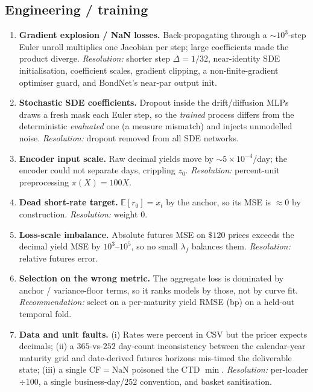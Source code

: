 \documentclass[11pt]{article}
\newcommand{\E}{\mathbb{E}}
\newcommand{\cf}{\mathrm{CF}}
\begin{document}
\subsection{Engineering / training}
\begin{enumerate}[leftmargin=2em,label=\textbf{E\arabic*.}]
\item\label{prob:nan} \textbf{Gradient explosion / NaN losses.} Back-propagating
through a $\sim\!10^3$-step Euler unroll multiplies one Jacobian per step;
large coefficients made the product diverge.
\emph{Resolution:} shorter step $\Delta=1/32$, near-identity SDE
initialisation, coefficient scales, gradient clipping, a non-finite-gradient
optimiser guard, and BondNet's near-par output init.
\item\label{prob:dropout} \textbf{Stochastic SDE coefficients.} Dropout inside
the drift/diffusion MLPs draws a fresh mask each Euler step, so the
\emph{trained} process differs from the deterministic \emph{evaluated} one (a
measure mismatch) and injects unmodelled noise. \emph{Resolution:} dropout
removed from all SDE networks.
\item\label{prob:enc} \textbf{Encoder input scale.} Raw decimal yields move by
$\sim 5\times10^{-4}$/day; the encoder could not separate days, crippling
$z_0$. \emph{Resolution:} percent-unit preprocessing $\pi(X)=100X$.
\item\label{prob:deadsr} \textbf{Dead short-rate target.} $\E[r_0]=x_t$ by the
anchor, so its MSE is $\approx0$ by construction. \emph{Resolution:} weight $0$.
\item\label{prob:scale} \textbf{Loss-scale imbalance.} Absolute futures MSE on
$\$120$ prices exceeds the decimal yield MSE by $10^3$--$10^5$, so no small
$\lambda_f$ balances them. \emph{Resolution:} relative futures error.
\item\label{prob:select} \textbf{Selection on the wrong metric.} The aggregate
loss is dominated by anchor / variance-floor terms, so it ranks models by
those, not by curve fit. \emph{Recommendation:} select on a per-maturity yield
RMSE (bp) on a held-out temporal fold.
\item\label{prob:data} \textbf{Data and unit faults.} (i) Rates were percent
in CSV but the pricer expects decimals; (ii) a $365$-vs-$252$ day-count
inconsistency between the calendar-year maturity grid and date-derived futures
horizons mis-timed the deliverable state; (iii) a single $\cf=\mathrm{NaN}$
poisoned the CTD $\min$. \emph{Resolution:} per-loader $\div100$, a single
business-day/$252$ convention, and basket sanitisation.
\end{enumerate}
\end{document}
